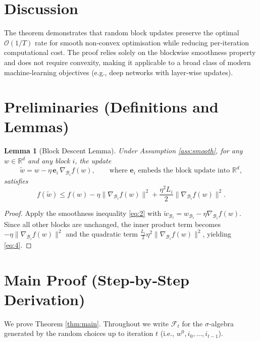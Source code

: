 \documentclass{article}
\newtheorem{lemma}{Lemma}
\newcommand{\R}{\mathbb{R}}
\begin{document}
\section*{Discussion}
The theorem demonstrates that random block updates preserve the
optimal $\mathcal{O}(1/T)$ rate for smooth non‑convex optimisation while
reducing per‑iteration computational cost.  The proof relies solely on
the blockwise smoothness property and does not require convexity,
making it applicable to a broad class of modern machine‑learning
objectives (e.g., deep networks with layer‑wise updates).

\newpage
\section*{Preliminaries (Definitions and Lemmas)}
\begin{lemma}[Block Descent Lemma]\label{lem:descent}
Under Assumption \ref{ass:smooth}, for any $w\in\R^{d}$ and any block
$i$, the update
\[
\tilde w = w - \eta\,\mathbf{e}_{i}\,\nabla_{\mathcal{B}_{i}}f(w),
\qquad\text{where }\mathbf{e}_{i}\text{ embeds the block update into }\R^{d},
\]
satisfies
\[
f(\tilde w)\le f(w)-\eta\|\nabla_{\mathcal{B}_{i}}f(w)\|^{2}
      +\frac{\eta^{2}L_{i}}{2}\|\nabla_{\mathcal{B}_{i}}f(w)\|^{2}.
\tag{4}
\]
\end{lemma}
\begin{proof}
Apply the smoothness inequality \eqref{eq:2} with
$\tilde w_{\mathcal{B}_{i}}=w_{\mathcal{B}_{i}}-\eta\nabla_{\mathcal{B}_{i}}f(w)$.
Since all other blocks are unchanged, the inner product term becomes
$-\eta\|\nabla_{\mathcal{B}_{i}}f(w)\|^{2}$ and the quadratic term
$\frac{L_{i}}{2}\eta^{2}\|\nabla_{\mathcal{B}_{i}}f(w)\|^{2}$, yielding \eqref{eq:4}.
\end{proof}

\section*{Main Proof (Step‑by‑Step Derivation)}
We prove Theorem \ref{thm:main}.  Throughout we write
$\mathcal{F}_{t}$ for the $\sigma$‑algebra generated by the random choices
up to iteration $t$ (i.e., $w^{0},i_{0},\dots ,i_{t-1}$).
\end{document}
